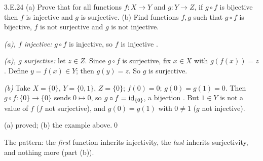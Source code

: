 \begin{bookex}[essential]{3.E.24}
(a) Prove that for all functions $f:X\to Y$ and $g:Y\to Z$, if $g\circ f$ is bijective then $f$ is injective and $g$ is surjective. (b) Find functions $f,g$ such that $g\circ f$ is bijective, $f$ is not surjective and $g$ is not injective.
\solution
\begin{steps}
\item \emph{(a), $f$ injective:} $g\circ f$ is injective, so $f$ is injective .
\item \emph{(a), $g$ surjective:} let $z\in Z$. Since $g\circ f$ is surjective, fix $x\in X$ with $g(f(x))=z$. Define $y=f(x)\in Y$; then $g(y)=z$. So $g$ is surjective.
\item \emph{(b)} Take $X=\{0\}$, $Y=\{0,1\}$, $Z=\{0\}$; $f(0)=0$; $g(0)=g(1)=0$. Then $g\circ f:\{0\}\to\{0\}$ sends $0\mapsto0$, so $g\circ f=\mathrm{id}_{\{0\}}$, a bijection . But $1\in Y$ is not a value of $f$ ($f$ not surjective), and $g(0)=g(1)$ with $0\ne1$ ($g$ not injective).
\end{steps}
\conclusion (a) proved; (b) the example above.\qed
\begin{compare}
\item The pattern: the \emph{first} function inherits injectivity, the \emph{last} inherits surjectivity, and nothing more (part (b)).
\end{compare}
\end{bookex}

